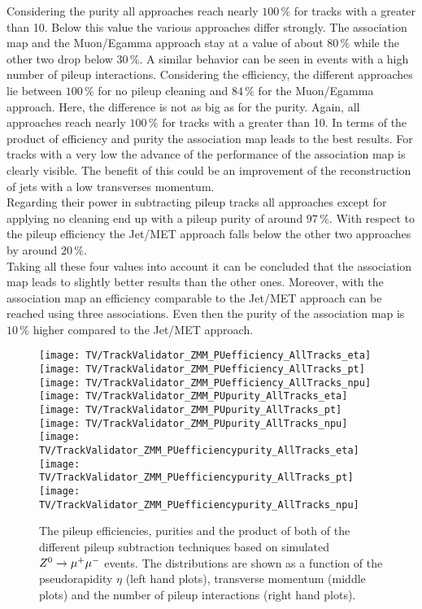 Considering the purity all approaches reach nearly $100\,\%$ for tracks with a \pt greater than 10\GeV. Below this value the various approaches differ strongly. The association map and the Muon/Egamma approach stay at a value of about $80\,\%$ while the other two drop below $30\,\%$. A similar behavior can be seen in events with a high number of pileup interactions. Considering the efficiency, the different approaches lie between $100\,\%$ for no pileup cleaning and $84\,\%$ for the Muon/Egamma approach. Here, the difference is not as big as for the purity. Again, all approaches reach nearly $100\,\%$ for tracks with a \pt greater than 10\GeV. In terms of the product of efficiency and purity the association map leads to the best results. For tracks with a very low \pt{} the advance of the performance of the association map is clearly visible. The benefit of this could be an improvement of the reconstruction of jets with a low transverses momentum.\\
Regarding their power in subtracting pileup tracks all approaches except for applying no cleaning end up with a pileup purity of around $97\,\%$. With respect to the pileup efficiency the Jet/MET approach falls below the other two approaches by around $20\,\%$.\\
Taking all these four values into account it can be concluded that the association map leads to slightly better results than the other ones. Moreover, with the association map an efficiency comparable to the Jet/MET approach can be reached using three associations. Even then the purity of the association map is $10\,\%$ higher compared to the Jet/MET approach.

\begin{figure}[Ht]
    \centering
    \texttt{[image: TV/TrackValidator\_ZMM\_PUefficiency\_AllTracks\_eta]}
    \texttt{[image: TV/TrackValidator\_ZMM\_PUefficiency\_AllTracks\_pt]}
    \texttt{[image: TV/TrackValidator\_ZMM\_PUefficiency\_AllTracks\_npu]}
    \\
    \texttt{[image: TV/TrackValidator\_ZMM\_PUpurity\_AllTracks\_eta]}
    \texttt{[image: TV/TrackValidator\_ZMM\_PUpurity\_AllTracks\_pt]}
    \texttt{[image: TV/TrackValidator\_ZMM\_PUpurity\_AllTracks\_npu]}
    \\
    \texttt{[image: TV/TrackValidator\_ZMM\_PUefficiencypurity\_AllTracks\_eta]}
    \texttt{[image: TV/TrackValidator\_ZMM\_PUefficiencypurity\_AllTracks\_pt]}
    \texttt{[image: TV/TrackValidator\_ZMM\_PUefficiencypurity\_AllTracks\_npu]}
    \caption[Pileup efficiencies, purities and their product of the different pileup subtraction techniques based on simulated $\Zz\rightarrow\MM$ events]{The pileup efficiencies, purities and the product of both of the different pileup subtraction techniques based on simulated $\Zz\rightarrow\MM$ events. The distributions are shown as a function of the pseudorapidity $\eta$ (left hand plots), transverse momentum (middle plots) and the number of pileup interactions (right hand plots). \label{plot:TACOAACPZMMPileup}}
\end{figure}

